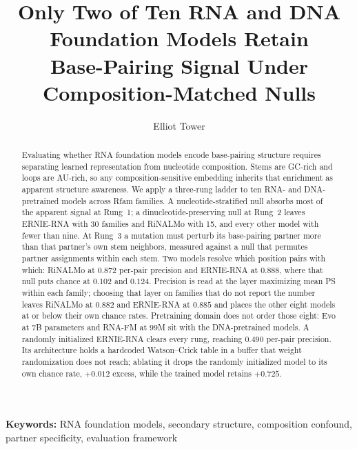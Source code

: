 \documentclass[11pt]{article}
\title{Only Two of Ten RNA and DNA Foundation Models Retain\\Base-Pairing Signal Under Composition-Matched Nulls}
\author{Elliot Tower}
\affil{Independent researcher \\ \texttt{elliot@elliottower.ai}}
\date{}
\begin{document}
\maketitle

\noindent\textbf{Keywords:} RNA foundation models, secondary structure, composition confound, partner specificity, evaluation framework

\begin{abstract}
Evaluating whether RNA foundation models encode base-pairing structure requires
separating learned representation from nucleotide composition. Stems are GC-rich
and loops are AU-rich, so any composition-sensitive embedding inherits that
enrichment as apparent structure awareness. We apply a three-rung ladder to ten
RNA- and DNA-pretrained models across \panelN{} Rfam families. A
nucleotide-stratified null absorbs most of the apparent signal at Rung~1; a
dinucleotide-preserving null at Rung~2 leaves ERNIE-RNA with 30 families and
RiNALMo with 15, and every other model with fewer than nine. At Rung~3 a
mutation must perturb its base-pairing partner more than that partner's own stem
neighbors, measured against a null that permutes partner assignments within
each stem. Two models resolve which position pairs with which: RiNALMo at
$0.872$ per-pair precision and ERNIE-RNA at $0.888$, where that null puts chance
at $0.102$ and $0.124$. Precision is read at the layer maximizing mean PS within
each family; choosing that layer on families that do not report the number
leaves RiNALMo at $0.882$ and ERNIE-RNA at $0.885$ and places the other eight
models at or below their own chance rates. Pretraining domain does not order
those eight: Evo at 7B parameters and RNA-FM at 99M sit with the
DNA-pretrained models.
A randomly initialized ERNIE-RNA clears every rung, reaching $0.490$ per-pair
precision. Its architecture holds a hardcoded Watson--Crick table in a buffer
that weight randomization does not reach; ablating it drops the randomly
initialized model to its own chance rate, $+0.012$ excess, while the trained
model retains $+0.725$.
\end{abstract}

\end{document}
